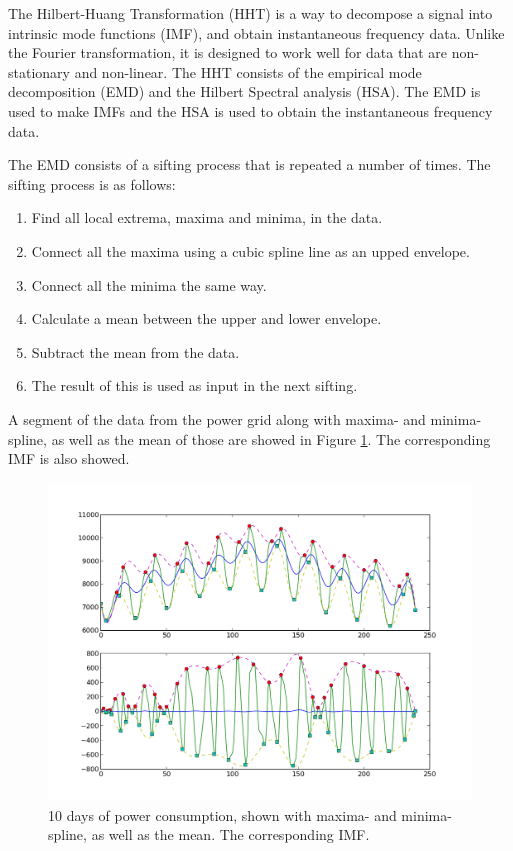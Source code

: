 \documentclass[12pt]{article}
\begin{document}
	The Hilbert-Huang Transformation (HHT) is a way to decompose a signal into intrinsic mode functions (IMF), and obtain instantaneous frequency data. Unlike the Fourier transformation, it is designed to work well for data that are non-stationary and non-linear. The HHT consists of the empirical mode decomposition (EMD) and the Hilbert Spectral analysis (HSA). The EMD is used to make IMFs and the HSA is used to obtain the instantaneous frequency data.
	
	The EMD consists of a sifting process that is repeated a number of times. The sifting process is as follows:
	
	\begin{enumerate}
		\item Find all local extrema, maxima and minima, in the data.
		\item Connect all the maxima using a cubic spline line as an upped envelope.
		\item Connect all the minima the same way.
		\item Calculate a mean between the upper and lower envelope.
		\item Subtract the mean from the data.
		\item The result of this is used as input in the next sifting.
	\end{enumerate}
	
	A segment of the data from the power grid along with maxima- and minima-spline, as well as the mean of those are showed in Figure \ref{fig:dataandimf}. The corresponding IMF is also showed.
	\begin{figure}[h]
		\centering
		\includegraphics[width = \textwidth]{dataandimf}
		\caption{10 days of power consumption, shown with maxima- and minima-spline, as well as the mean. The corresponding IMF.}
		\label{fig:dataandimf}
	\end{figure}
	
\end{document}
